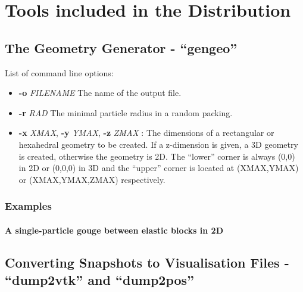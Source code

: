 \documentclass{manual}
\begin{document}
\chapter{Tools included in the Distribution}

\section{The Geometry Generator - ``gengeo''}
\label{sec:gengeo}

List of command line options:

\begin{itemize}

\item {\bf -o} {\it FILENAME} The name of the output file.
\item {\bf -r} {\it RAD} The minimal particle radius in a random packing.
\item {\bf -x} {\it XMAX}, {\bf -y} {\it YMAX}, {\bf -z} {\it ZMAX} : The dimensions of a rectangular or hexahedral geometry to be created. If a z-dimension is given, a 3D geometry is created, otherwise the geometry is 2D. The ``lower'' corner is always (0,0) in 2D or (0,0,0) in 3D and the ``upper'' corner is located at (XMAX,YMAX) or (XMAX,YMAX,ZMAX) respectively.
\end{itemize}

\subsection{Examples}

\subsubsection{A single-particle gouge between elastic blocks in 2D} 

\section{Converting Snapshots to Visualisation Files - ``dump2vtk'' and ``dump2pos''}






\end{document}
